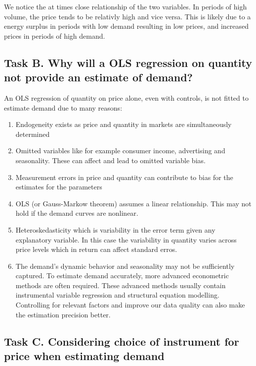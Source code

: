 \documentclass[
  letterpaper,
  DIV=11,
  numbers=noendperiod]{scrartcl}
\begin{document}
We notice the at times close relationship of the two variables. In
periods of high volume, the price tends to be relativly high and vice
versa. This is likely due to a energy surplus in periods with low demand
resulting in low prices, and increased prices in periods of high demand.

\hypertarget{task-b.-why-will-a-ols-regression-on-quantity-not-provide-an-estimate-of-demand}{%
\subsection{Task B. Why will a OLS regression on quantity not provide an
estimate of
demand?}\label{task-b.-why-will-a-ols-regression-on-quantity-not-provide-an-estimate-of-demand}}

An OLS regression of quantity on price alone, even with controls, is not
fitted to estimate demand due to many reasons:

\begin{enumerate}
\def\labelenumi{\arabic{enumi}.}
\item
  Endogeneity exists as price and quantity in markets are simultaneously
  determined
\item
  Omitted variables like for example consumer income, advertising and
  seasonality. These can affect and lead to omitted variable bias.
\item
  Measurement errors in price and quantity can contribute to bias for
  the estimates for the parameters
\item
  OLS (or Gauss-Markow theorem) assumes a linear relationship. This may
  not hold if the demand curves are nonlinear.
\item
  Heteroskedasticity which is variability in the error term given any
  explanatory variable. In this case the variability in quantity varies
  across price levels which in return can affect standard erros.
\item
  The demand's dynamic behavior and seasonality may not be sufficiently
  captured. To estimate demand accurately, more advanced econometric
  methods are often required. These advanced methods usually contain
  instrumental variable regression and structural equation modelling.
  Controlling for relevant factors and improve our data quality can also
  make the estimation precision better.
\end{enumerate}

\hypertarget{task-c.-considering-choice-of-instrument-for-price-when-estimating-demand}{%
\subsection{Task C. Considering choice of instrument for price when
estimating
demand}\label{task-c.-considering-choice-of-instrument-for-price-when-estimating-demand}}
\end{document}
